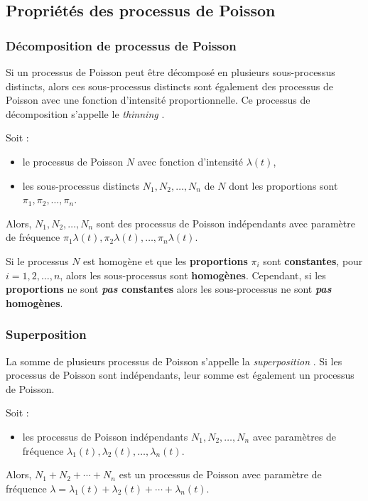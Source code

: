 \documentclass[french]{article}
\begin{document}
\begin{multicols*}{2}
\columnbreak
\subsection{Propriétés des processus de Poisson}
\subsubsection{Décomposition de processus de Poisson}
\begin{definitionNOHFILL}
Si un processus de Poisson peut être décomposé en plusieurs sous-processus distincts, alors ces sous-processus distincts sont également des processus de Poisson avec une fonction d'intensité proportionnelle. Ce processus de décomposition s'appelle le \og \textit{thinning} \fg{}.	

\bigskip

Soit :
\begin{itemize}
	\item	le processus de Poisson $N$ avec fonction d'intensité $\lambda(t)$,
	\item	les sous-processus distincts $N_{1}, N_{2}, \dots, N_{n}$ de $N$ dont les proportions sont $\pi_{1}, \pi_{2}, \dots, \pi_{n}$.
\end{itemize}
Alors, $N_{1}, N_{2}, \dots, N_{n}$ sont des processus de Poisson indépendants avec paramètre de fréquence $\pi_{1}\lambda(t), \pi_{2}\lambda(t), \dots, \pi_{n}\lambda(t)$.
\end{definitionNOHFILL}

Si le processus $N$ est homogène et que les \textbf{proportions} $\pi_{i}$ sont \textbf{constantes}, pour $i = 1, 2, \dots, n$, alors les sous-processus sont \textbf{homogènes}. Cependant, si les \textbf{proportions} ne sont \textbf{\textit{pas} constantes} alors les sous-processus ne sont \textbf{\textit{pas} homogènes}.


\subsubsection{Superposition}
\begin{definitionNOHFILL}
La somme de plusieurs processus de Poisson s'appelle la \og \textit{superposition} \fg{}.	 Si les processus de Poisson sont indépendants, leur somme est également un processus de Poisson.	

\bigskip

Soit :
\begin{itemize}
	\item	les processus de Poisson indépendants $N_{1}, N_{2}, \dots, N_{n}$ avec paramètres de fréquence $\lambda_{1}(t), \lambda_{2}(t), \dots, \lambda_{n}(t)$.
\end{itemize}
Alors, $N_{1} + N_{2} + \cdots + N_{n}$ est un processus de Poisson avec paramètre de fréquence $\lambda	=	\lambda_{1}(t) + \lambda_{2}(t) + \cdots + \lambda_{n}(t)$.
\end{definitionNOHFILL}



\end{multicols*}
\end{document}
